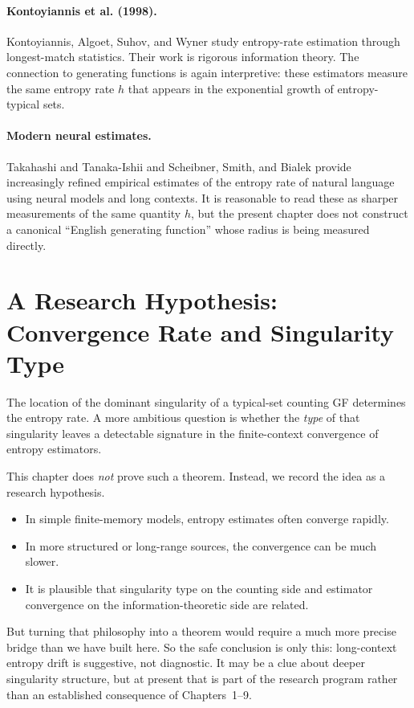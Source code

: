 \paragraph{Kontoyiannis et al.
(1998).}
Kontoyiannis, Algoet, Suhov, and Wyner \cite{KontoyiannisEtAl1998} study entropy-rate estimation through longest-match statistics. Their work is rigorous information theory. The connection to generating functions is again interpretive: these estimators measure the same entropy rate $h$ that appears in the exponential growth of entropy-typical sets.

\paragraph{Modern neural estimates.}
Takahashi and Tanaka-Ishii \cite{TakahashiTanakaIshii2018} and Scheibner, Smith, and Bialek \cite{ScheibnerSmithBialek2025} provide increasingly refined empirical estimates of the entropy rate of natural language using neural models and long contexts. It is reasonable to read these as sharper measurements of the same quantity $h$, but the present chapter does not construct a canonical ``English generating function'' whose radius is being measured directly.

\section{A Research Hypothesis: Convergence Rate and Singularity Type}

The location of the dominant singularity of a typical-set counting GF determines the entropy rate. A more ambitious question is whether the \emph{type} of that singularity leaves a detectable signature in the finite-context convergence of entropy estimators.

This chapter does \emph{not} prove such a theorem. Instead, we record the idea as a research hypothesis.

\begin{itemize}
  \item In simple finite-memory models, entropy estimates often converge rapidly.
  \item In more structured or long-range sources, the convergence can be much slower.
  \item It is plausible that singularity type on the counting side and estimator convergence on the information-theoretic side are related.
\end{itemize}

But turning that philosophy into a theorem would require a much more precise bridge than we have built here. So the safe conclusion is only this: long-context entropy drift is suggestive, not diagnostic. It may be a clue about deeper singularity structure, but at present that is part of the research program rather than an established consequence of Chapters~1--9.


